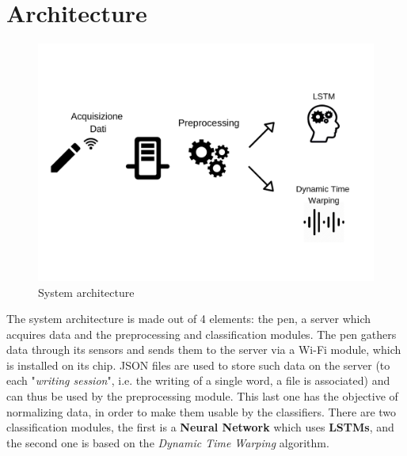 \documentclass[8pt,notitlepage]{report}
\begin{document}
\chapter{Architecture}
	\begin{figure}[H]
		\begin{center}
			\includegraphics[scale=.25]{architettura}
			\caption{System architecture}
		\end{center}
	\end{figure}		
	The system architecture is made out of 4 elements: the pen, a server which acquires data and the preprocessing and classification modules. The pen gathers data through its sensors and sends them to the server via a Wi-Fi module, which is installed on its chip. JSON files are used to store such data on the server (to each "\textit{writing session}", i.e. the writing of a single word,  a file is associated) and can thus be used by the preprocessing module. This last one has the objective of normalizing data, in order to make them usable by the classifiers. There are two classification modules, the first is a \textbf{Neural Network} which uses  \textbf{LSTMs}, and the second one is based on the \textit{Dynamic Time Warping} algorithm.
\end{document}
